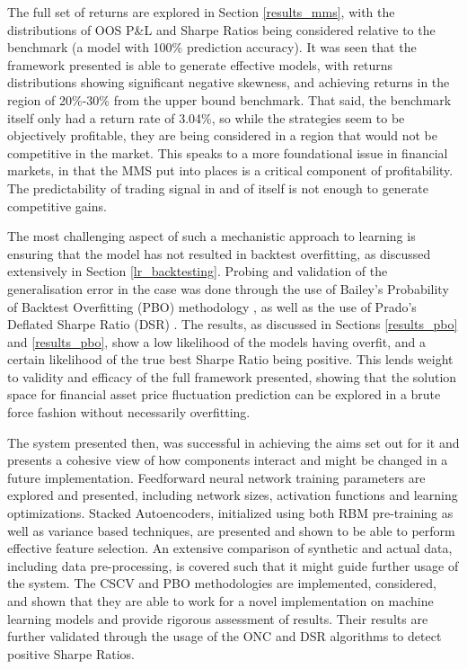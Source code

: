 \documentclass[a4paper,11pt,oneside]{article}
\theoremstyle{plain}
\theoremstyle{definition}
\begin{document}
	The full set of returns are explored in Section \ref{results_mms}, with the distributions of OOS P\&L and Sharpe Ratios being considered relative to the benchmark (a model with 100\% prediction accuracy). It was seen that the framework presented is able to generate effective models, with returns distributions showing significant negative skewness, and achieving returns in the region of 20\%-30\% from the upper bound benchmark. That said, the benchmark itself only had a return rate of 3.04\%, so while the strategies seem to be objectively profitable, they are being considered in a region that would not be competitive in the market. This speaks to a more foundational issue in financial markets, in that the MMS put into places is a critical component of profitability. The predictability of trading signal in and of itself is not enough to generate competitive gains.\newline
	
	The most challenging aspect of such a mechanistic approach to learning is ensuring that the model has not resulted in backtest overfitting, as discussed extensively in Section \ref{lr_backtesting}. Probing and validation of the generalisation error in the case was done through the use of Bailey's Probability of Backtest Overfitting (PBO) methodology \cite{BailyPBO}, as well as the use of Prado's Deflated Sharpe Ratio (DSR) \cite{PradoDSR}. The results, as discussed in Sections \ref{results_pbo} and \ref{results_pbo}, show a low likelihood of the models having overfit, and a certain likelihood of the true best Sharpe Ratio being positive. This lends weight to validity and efficacy of the full framework presented, showing that the solution space for financial asset price fluctuation prediction can be explored in a brute force fashion without necessarily overfitting.\newline

	The system presented then, was successful in achieving the aims set out for it and presents a cohesive view of how components interact and might be changed in a future implementation. Feedforward neural network training parameters are explored and presented, including network sizes, activation functions and learning optimizations. Stacked Autoencoders, initialized using both RBM pre-training as well as variance based techniques, are presented and shown to be able to perform effective feature selection. An extensive comparison of synthetic and actual data, including data pre-processing, is covered such that it might guide further usage of the system. The CSCV and PBO methodologies are implemented, considered, and shown that they are able to work for a novel implementation on machine learning models and provide rigorous assessment of results. Their results are further validated through the usage of the ONC and DSR algorithms to detect positive Sharpe Ratios. \newline 
	
\end{document}
